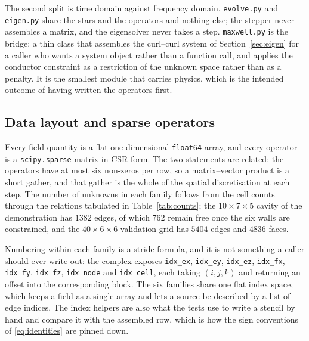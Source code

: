 The second split is time domain against frequency domain. \texttt{evolve.py} and \texttt{eigen.py} share the stars
and the operators and nothing else; the stepper never assembles a matrix, and the eigensolver never takes a step.
\texttt{maxwell.py} is the bridge: a thin class that assembles the curl--curl system of Section~\ref{sec:eigen}
for a caller who wants a system object rather than a function call, and applies the conductor constraint as a
restriction of the unknown space rather than as a penalty. It is the smallest module that carries physics, which is the
intended outcome of having written the operators first.

\subsection{Data layout and sparse operators}
\label{sec:layout}

Every field quantity is a flat one-dimensional \texttt{float64} array, and every operator is a
\texttt{scipy.sparse} matrix in CSR form. The two statements are related: the operators have at most six
non-zeros per row, so a matrix--vector product is a short gather, and that gather is the whole of the spatial
discretisation at each step. The number of unknowns in each family follows from the cell counts through the
relations tabulated in Table~\ref{tab:counts}; the $10\times7\times5$ cavity of the demonstration has $1382$
edges, of which $762$ remain free once the six walls are constrained, and the $40\times6\times6$ validation grid
has $5404$ edges and $4836$ faces.

Numbering within each family is a stride formula, and it is not something a caller should ever write out: the
complex exposes \texttt{idx\_ex}, \texttt{idx\_ey}, \texttt{idx\_ez}, \texttt{idx\_fx}, \texttt{idx\_fy},
\texttt{idx\_fz}, \texttt{idx\_node} and \texttt{idx\_cell}, each taking $(i,j,k)$ and returning an offset into
the corresponding block. The six families share one flat index space, which keeps a field as a single array and
lets a source be described by a list of edge indices. The index helpers are also what the tests use to write a
stencil by hand and compare it with the assembled row, which is how the sign conventions of
\eqref{eq:identities} are pinned down.

